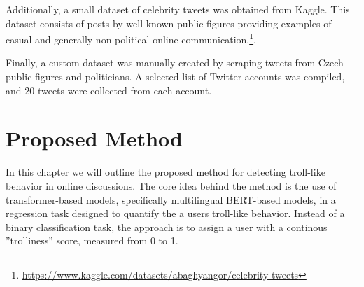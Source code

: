 \documentclass[twoside]{ctuthesis}
\theoremstyle{plain}
\theoremstyle{definition}
\theoremstyle{note}
\begin{document}
Additionally, a small dataset of celebrity tweets was obtained from Kaggle. This dataset consists of posts by well-known public figures providing examples of casual and generally non-political online communication.\footnote{\url{https://www.kaggle.com/datasets/abaghyangor/celebrity-tweets}}.\par

Finally, a custom dataset was manually created by scraping tweets from Czech public figures and politicians. A selected list of Twitter accounts was compiled, and 20 tweets were collected from each account. \par

\chapter{Proposed Method}
In this chapter we will outline the proposed method for detecting troll-like behavior in online discussions. The core idea behind the method is the use of transformer-based models, specifically multilingual BERT-based models, in a regression task designed to quantify the a users troll-like behavior. Instead of a binary classification task, the approach is to assign a user with a continous ''trolliness'' score, measured from 0 to 1.\par
\end{document}
